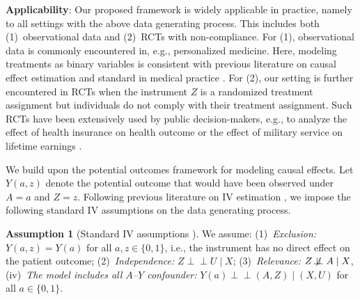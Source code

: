 \documentclass{article} %
\newcommand{\indep}{\perp \!\!\! \perp}
\newcommand{\indepnot}{\not\!\perp\!\!\!\perp}
\theoremstyle{definition}
\newtheorem{assumption}{Assumption}
\theoremstyle{plain}
\begin{document}
\textbf{Applicability}: Our proposed framework is widely applicable in practice, namely to all settings with the above data generating process. This includes both (1)~observational data and (2)~RCTs with non-compliance. For (1), observational data is commonly encountered in, e.g., personalized medicine. Here, modeling treatments as binary variables is consistent with previous literature on causal effect estimation and standard in medical practice \citep{Robins.2000}. For (2), our setting is further encountered in RCTs when the instrument $Z$ is a randomized treatment assignment but individuals do not comply with their treatment assignment. Such RCTs have been extensively used by public decision-makers, e.g., to analyze the effect of health insurance on health outcome \citep{Finkelstein.2012} or the effect of military service on lifetime earnings \citep{Angrist.1990}. 

We build upon the potential outcomes framework \citep{Rubin.1974} for modeling causal effects. Let $Y(a,z)$ denote the potential outcome that would have been observed under $A=a$ and $Z=z$. Following previous literature on IV estimation \citep{Wang.2018}, we impose the following standard IV assumptions on the data generating process.

\begin{assumption}[Standard IV assumptions \citep{Wang.2018, Wooldridge.2013}]
\label{ass:iv}
We assume: (1)~\emph{Exclusion:} $Y(a,z) = Y(a)$ for all $a, z \in \{0,1\}$, i.e., the instrument has no direct effect on the patient outcome; (2)~\emph{Independence:} $Z \indep U \mid X$; (3)~\emph{Relevance:} $Z \indepnot A \mid X$, (iv)~\emph{The model includes all $A$--$Y$ confounder:} $Y(a) \indep (A, Z) \mid (X, U)$ for all $a \in \{0,1\}$.
\end{assumption}
\end{document}
